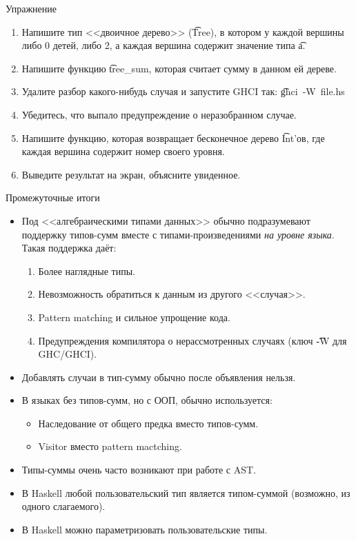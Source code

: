 \begin{frame}[fragile]{Упражнение}
	\begin{enumerate}
		\item Напишите тип <<двоичное дерево>> (\t{Tree}), в котором у каждой вершины либо 0 детей, либо 2, а каждая вершина содержит значение типа \t{a}.
		\item Напишите функцию \t{tree\_sum}, которая считает сумму в данном ей дереве.
		\item Удалите разбор какого-нибудь случая и запустите GHCI так: \t{ghci~-W~file.hs}
		\item Убедитесь, что выпало предупреждение о неразобранном случае.
		\item Напишите функцию, которая возвращает бесконечное дерево \t{Int}'ов, где каждая вершина содержит номер своего уровня.
		\item Выведите результат на экран, объясните увиденное.
	\end{enumerate}
\end{frame}

\begin{frame}{Промежуточные итоги}
	\begin{itemize}
		\item
			Под <<алгебраическими типами данных>> обычно подразумевают поддержку типов-сумм вместе с типами-произведениями \textit{на уровне языка}.
			Такая поддержка даёт:
			\begin{enumerate}
				\item Более наглядные типы.
				\item Невозможность обратиться к данным из другого <<случая>>.
				\item Pattern matching и сильное упрощение кода.
				\item Предупреждения компилятора о нерассмотренных случаях (ключ \t{-W} для GHC/GHCI).
			\end{enumerate}
		\item Добавлять случаи в тип-сумму обычно после объявления нельзя.
		\item В языках без типов-сумм, но с ООП, обычно используется:
			\begin{itemize}
				\item Наследование от общего предка вместо типов-сумм.
				\item Visitor вместо pattern mactching.
			\end{itemize}
		\item Типы-суммы очень часто возникают при работе с AST.
		\item В Haskell любой пользовательский тип является типом-суммой (возможно, из одного слагаемого).
		\item В Haskell можно параметризовать пользовательские типы.
	\end{itemize}
\end{frame}
